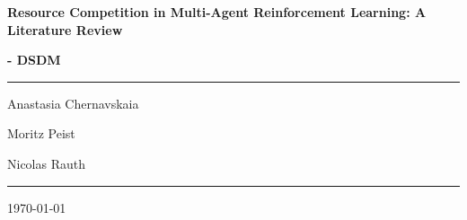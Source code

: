 \documentclass[12pt]{article}
\begin{document}
\begin{titlepage}
	\centering
	\par\vspace{0.75cm}
	{\huge\bfseries Resource Competition in Multi-Agent Reinforcement Learning: A Literature Review\par}
    \vspace{0.25cm}
    {\large\bfseries \cl - DSDM\par}
	\vspace{0.25cm}
    \noindent\rule{\textwidth}{1pt}
    {\Large Anastasia Chernavskaia\par}
	{\Large Moritz Peist\par}
    {\Large Nicolas Rauth\par}
    \noindent\rule{\textwidth}{1pt}
	\vfill
    \begin{abstract}
        Multi-agent reinforcement learning in competitive resource environments represents a critical domain where autonomous agents must learn optimal strategies while competing for limited resources. This literature review examines recent developments in competitive multi-agent systems, with particular emphasis on resource allocation scenarios. We survey foundational work including OpenAI's MADDPG framework, sequential social dilemmas, emergent complexity through competition, and practical applications across industries. The review identifies key algorithmic approaches, addresses fundamental challenges, including non-stationarity and credit assignment in competitive settings, and highlights current research directions toward more robust and scalable competitive multi-agent systems.
    \end{abstract}
    \vfill
	{\large \today\par}
\end{titlepage}

\tableofcontents
\newpage

\newpage
\printbibliography

\newpage

\end{document}
